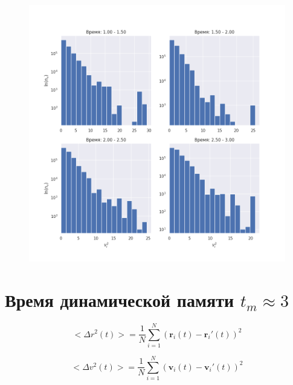 \documentclass[a4paper,12pt]{report}
\begin{document}
\begin{figure}[H]
    \centering
    \includegraphics[width=\textwidth]{../../media/velocities2.png}
\end{figure}

\section{Время динамической памяти \(t_m \approx 3\)}

\begin{equation}
    <\Delta r^2(t)> = \frac{1}{N} \sum_{i = 1}^N (\mathbf{r}_i(t) - \mathbf{r}_i'(t))^2
\end{equation}

\begin{equation}
    <\Delta v^2(t)> = \frac{1}{N} \sum_{i = 1}^N (\mathbf{v}_i(t) - \mathbf{v}_i'(t))^2
\end{equation}
\end{document}
